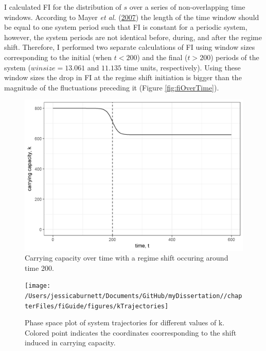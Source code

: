 \documentclass[12pt,twoside,openany]{reedthesis}
\begin{document}
I calculated FI for the distribution of \(s\) over a series of non-overlapping time windows. According to Mayer \emph{et al.} (\protect\hyperlink{ref-mayer_applications_2007}{2007}) the length of the time window should be equal to one system period such that FI is constant for a periodic system, however, the system periods are not identical before, during, and after the regime shift. Therefore, I performed two separate calculations of FI using window sizes corresponding to the initial (when \(t<200\)) and the final (\(t>200\)) periods of the system (\(winsize = 13.061\) and \(11.135\) time units, respectively). Using these window sizes the drop in FI at the regime shift initiation is bigger than the magnitude of the fluctuations preceding it (Figure \ref{fig:fiOverTime}).
\begin{figure}[bth]

{\centering \includegraphics[width=0.95\linewidth]{./chapterFiles/fiGuide/figures/kByTime} 

}

\caption{Carrying capacity over time with a regime shift occuring around time 200.}\label{fig:kByTime}
\end{figure}
\begin{figure}[bth]

{\centering \texttt{[image: /Users/jessicaburnett/Documents/GitHub/myDissertation//chapterFiles/fiGuide/figures/kTrajectories]} 

}

\caption{Phase space plot of system trajectories for different values of k. Colored point indicates the coordinates coorresponding to the shift induced in carrying capacity. }\label{fig:kTrajectories}
\end{figure}
\end{document}
